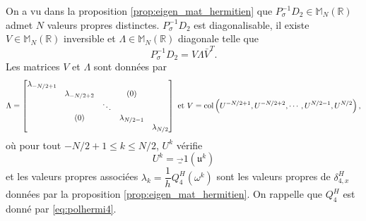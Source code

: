 On a vu dans la proposition \ref{prop:eigen_mat_hermitien} que $P^{-1}_{\sigma} D_2 \in \mathbb{M}_N(\mathbb{R})$ admet $N$ valeurs propres distinctes. $P^{-1}_{\sigma} D_2$ est diagonalisable, il existe $V\in \mathbb{M}_N(\mathbb{R})$ inversible et $\Lambda \in \mathbb{M}_N(\mathbb{R})$ diagonale telle que
\begin{equation}
P^{-1}_{\sigma} D_2 = V \Lambda \bar{V}^T.
\end{equation}
Les matrices $V$ et $\Lambda$ sont données par 
\begin{equation}
\Lambda = \begin{bmatrix}
\lambda_{-N/2+1} &   &   &   &   \\ 
  & \lambda_{-N/2+2} &   & (0) &   \\ 
  &   & \ddots &   &   \\ 
  & (0) &   & \lambda_{N/2-1} &   \\ 
  &   &   &   & \lambda_{N/2}
\end{bmatrix} \text{ et }
V = \text{col} \left( U^{-N/2+1}, U^{-N/2+2}, \cdots, U^{N/2-1}, U^{N/2} \right),
\label{eq:matrice_diagonalisation}
\end{equation}
où pour tout $-N/2+1 \leq k \leq N/2$, $U^k$ vérifie
\begin{equation}
U^k = \vec_1 ( \mathfrak{u}^k )
\end{equation} 
et les valeurs propres associées $\lambda_k = \dfrac{1}{h}Q_{4}^H(\omega^k)$ sont les valeurs propres de $\delta_{4,x}^H$ données par la proposition \ref{prop:eigen_mat_hermitien}. On rappelle que $Q_4^H$  est donné par \eqref{eq:polhermi4}.

